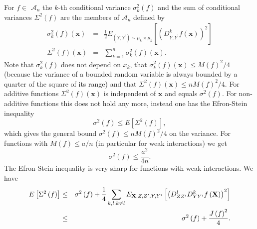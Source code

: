 \documentclass[final,12pt]{colt2018} %
\begin{document}
		For $f\in $ $\mathcal{A}_{n}$ the $k$-th conditional variance $\sigma
		_{k}^{2}\left( f\right) $ and the sum of conditional variances $\Sigma
		^{2}\left( f\right) $ are the members of $\mathcal{A}_{n}$ defined by%
		\begin{eqnarray*}
			\sigma _{k}^{2}\left( f\right) \left( \mathbf{x}\right) &=&\frac{1}{2}%
			E_{\left( Y,Y^{\prime }\right) \sim \mu _{k}\times \mu _{k}}\left[ \left(
			D_{Y,Y^{\prime }}^{k}f\left( \mathbf{x}\right) \right) ^{2}\right] \\
			\Sigma ^{2}\left( f\right) \left( \mathbf{x}\right) &=&\sum_{k=1}^{n}\sigma
			_{k}^{2}\left( f\right) \left( \mathbf{x}\right) .
		\end{eqnarray*}%
		Note that $\sigma _{k}^{2}\left( f\right) $ does not depend on $x_{k}$, that 
		$\sigma _{k}^{2}\left( f\right) \left( \mathbf{x}\right) \leq M\left(
		f\right) ^{2}/4$ (because the variance of a bounded random variable is
		always bounded by a quarter of the square of its range) and that $\Sigma
		^{2}\left( f\right) \left( \mathbf{x}\right) \leq nM\left( f\right) ^{2}/4$.
		For additive functions $\Sigma ^{2}\left( f\right) \left( \mathbf{x}\right) $
		is independent of $\mathbf{x}$ and equals $\sigma ^{2}\left( f\right) $. For
		non-additive functions this does not hold any more, instead one has the
		Efron-Stein inequality \citep{Efron 1981,Steele 1986} 
		\begin{equation}
		\sigma ^{2}\left( f\right) \leq E\left[ \Sigma ^{2}\left( f\right) \right] ,
		\label{Efron-Stein Inequality}
		\end{equation}%
		which gives the general bound $\sigma ^{2}\left( f\right) \leq nM\left(
		f\right) ^{2}/4$ on the variance. For functions with $M\left( f\right) \leq
		a/n$ (in particular for weak interactions) we get%
		\begin{equation}
		\sigma ^{2}\left( f\right) \leq \frac{a^{2}}{4n}.
		\label{A priori variance bound}
		\end{equation}%
		The Efron-Stein inequality is very sharp for functions with weak
		interactions. We have%
		\begin{eqnarray}
		E\left[ \Sigma ^{2}\left( f\right) \right] &\leq &\sigma ^{2}\left( f\right)
		+\frac{1}{4}\sum_{k,l:k\neq l}E_{\mathbf{X},Z,Z^{\prime },Y,Y^{\prime }}%
		\left[ \left( D_{ZZ^{\prime }}^{l}D_{YY^{\prime }}^{k}f\left( \mathbf{X}%
		\right) \right) ^{2}\right]  \notag \\
		&\leq &\sigma ^{2}\left( f\right) +\frac{J\left( f\right) ^{2}}{4}.
		\label{Houdre bound general}
		\end{eqnarray}%
\end{document}
